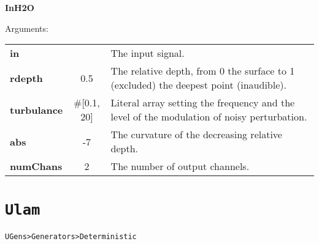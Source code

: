 \bigskip
\begin{addmargin}[1em]{0em}%
\begin{mdframed}[style=mystyle]

\bigskip

{\large \textbf{InH2O}}

\hrulefill

\color{gray!80}Arguments:\color{black} 

\bigskip

\begin{tabular}{l c p{6cm}}
\textbf{in} &  & The input signal.\\
\textbf{rdepth} & 0.5 & The relative depth, from 0 the surface to 1 (excluded) the deepest point (inaudible).\\
\textbf{turbulance} & \#[0.1, 20] &  Literal array setting the frequency and the level of the modulation of noisy perturbation.\\
\textbf{abs} & -7 & The curvature of the decreasing relative depth.\\
\textbf{numChans} & 2 & The number of output channels. %
\end{tabular}

\bigskip

\end{mdframed}
\end{addmargin}


\section{\texttt{Ulam}}
\label{colz}

\texttt{UGens>Generators>Deterministic}

\bigskip

